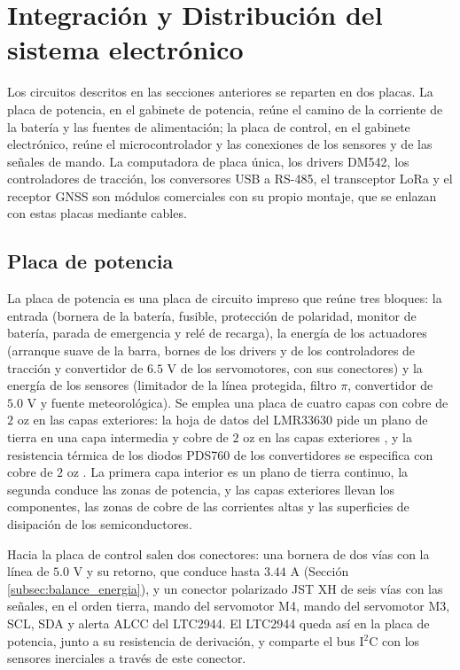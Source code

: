 \documentclass[../../General.tex]{subfiles}
\begin{document}
\section{Integración y Distribución del sistema electrónico}

Los circuitos descritos en las secciones anteriores se reparten en dos placas. La placa de potencia, en el gabinete de potencia, reúne el camino de la corriente de la batería y las fuentes de alimentación; la placa de control, en el gabinete electrónico, reúne el microcontrolador y las conexiones de los sensores y de las señales de mando. La computadora de placa única, los drivers DM542, los controladores de tracción, los conversores USB a RS-485, el transceptor LoRa y el receptor GNSS son módulos comerciales con su propio montaje, que se enlazan con estas placas mediante cables.

\subsection{Placa de potencia}

La placa de potencia es una placa de circuito impreso que reúne tres bloques: la entrada (bornera de la batería, fusible, protección de polaridad, monitor de batería, parada de emergencia y relé de recarga), la energía de los actuadores (arranque suave de la barra, bornes de los drivers y de los controladores de tracción y convertidor de $6.5\text{ V}$ de los servomotores, con sus conectores) y la energía de los sensores (limitador de la línea protegida, filtro $\pi$, convertidor de $5.0\text{ V}$ y fuente meteorológica). Se emplea una placa de cuatro capas con cobre de $2\text{ oz}$ en las capas exteriores: la hoja de datos del LMR33630 pide un plano de tierra en una capa intermedia y cobre de $2\text{ oz}$ en las capas exteriores \citep{ti_lmr33630}, y la resistencia térmica de los diodos PDS760 de los convertidores se especifica con cobre de $2\text{ oz}$ \citep{diodes_pds760}. La primera capa interior es un plano de tierra continuo, la segunda conduce las zonas de potencia, y las capas exteriores llevan los componentes, las zonas de cobre de las corrientes altas y las superficies de disipación de los semiconductores.

Hacia la placa de control salen dos conectores: una bornera de dos vías con la línea de $5.0\text{ V}$ y su retorno, que conduce hasta $3.44\text{ A}$ (Sección \ref{subsec:balance_energia}), y un conector polarizado JST XH de seis vías con las señales, en el orden tierra, mando del servomotor M4, mando del servomotor M3, SCL, SDA y alerta ALCC del LTC2944. El LTC2944 queda así en la placa de potencia, junto a su resistencia de derivación, y comparte el bus I$^2$C con los sensores inerciales a través de este conector.
\end{document}
